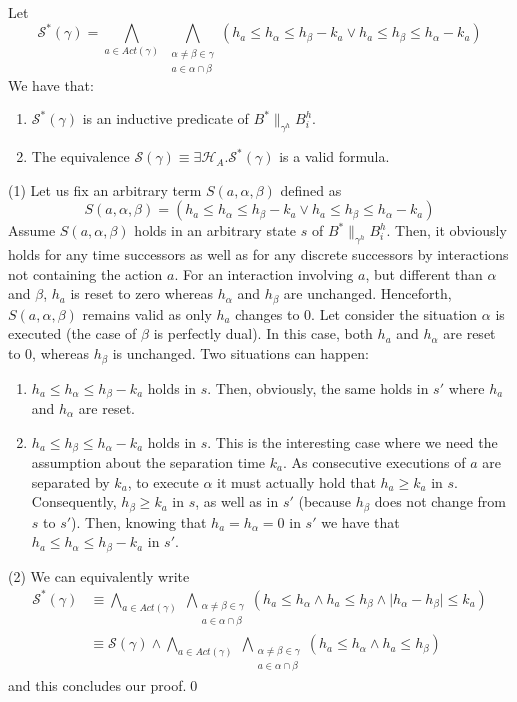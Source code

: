 \documentclass{LMCS}
\newcommand{\hp}{\mathcal{H}_A}
\newcommand{\sep}{\mathcal{S}}
\newcommand{\compgamma}{B^*}
\newcommand{\sysgammah}{\compgamma \|_{\gamma^h} B_i^h}
\theoremstyle{plain}\newtheorem{remark}[thm]{Remark}
\theoremstyle{plain}\newtheorem{example}[thm]{Example}
\begin{document}
\begin{prop} \label{p:cI} 
 Let $$\sep^*(\gamma) = \displaystyle{\bigwedge_{a \in
     Act(\gamma)}}\;\displaystyle{\bigwedge_{\substack{\alpha\neq\beta \in
       \gamma\\a \in \alpha \cap \beta}}} (h_a \le h_{\alpha} \le h_{\beta}
 - k_a \vee h_a \le h_{\beta} \le h_{\alpha} - k_a)$$
We have that:
\begin{enumerate}\item $\sep^*(\gamma)$ is an inductive predicate of $\sysgammah$.
\item The equivalence $\sep(\gamma) \equiv \exists \hp. \sep^*(\gamma)$ is a valid formula.
\end{enumerate}
\end{prop}
\proof (1) Let us fix an arbitrary term $S(a,\alpha,\beta)$ defined as 
$$S(a,\alpha,\beta) = (h_a \le h_{\alpha} \le h_{\beta}
- k_a \vee h_a \le h_{\beta} \le h_{\alpha} - k_a)$$ Assume
$S(a,\alpha,\beta)$ holds in an arbitrary state $s$ of $\sysgammah$.
Then, it obviously holds for any time successors as well as for any
discrete successors by interactions not containing the action $a$.
For an interaction involving $a$, but different than $\alpha$ and
$\beta$, $h_a$ is reset to zero whereas $h_\alpha$ and $h_\beta$ are
unchanged.  Henceforth, $S(a,\alpha,\beta)$ remains valid as only
$h_a$ changes to 0.  Let consider the situation $\alpha$ is executed
(the case of $\beta$ is perfectly dual).  In this case, both $h_a$ and
$h_\alpha$ are reset to 0, whereas $h_\beta$ is unchanged.  Two
situations can happen:
\begin{enumerate}[label=\({\alph*}]\item $h_a \le h_{\alpha} \le h_{\beta} - k_a$ holds in $s$.  Then,
  obviously, the same holds in $s'$ where $h_a$ and $h_\alpha$ are reset.
\item $h_a \le h_{\beta} \le h_{\alpha} - k_a$ holds in $s$.  This is the
  interesting case where we need the assumption about the separation time
  $k_a$.  As consecutive executions of $a$ are separated by $k_a$, to
  execute $\alpha$ it must actually hold that $h_a \ge k_a$ in $s$.
  Consequently, $h_\beta \ge k_a$ in $s$, as well as in $s'$ (because
  $h_\beta$ does not change from $s$ to $s'$).  Then, knowing that $h_a =
  h_\alpha = 0$ in $s'$ we have that $h_a \le h_\alpha \le h_\beta - k_a$
  in $s'$.
\end{enumerate}
(2) We can equivalently write 
\begin{align*}
\sep^*(\gamma) 
& \equiv \displaystyle{\bigwedge_{a \in
     Act(\gamma)}}\;\displaystyle{\bigwedge_{\substack{\alpha\neq\beta \in
       \gamma\\a \in \alpha \cap \beta}}} (h_a \le h_{\alpha} \wedge h_a \le h_\beta \wedge \mid h_\alpha - h_\beta \mid \le k_a) 
\end{align*}
\begin{align*}
& \equiv \sep(\gamma) \wedge \displaystyle{\bigwedge_{a \in
     Act(\gamma)}}\;\displaystyle{\bigwedge_{\substack{\alpha\neq\beta \in
       \gamma\\a \in \alpha \cap \beta}}} (h_a \le h_{\alpha} \wedge h_a \le h_{\beta}) 
\end{align*}
and this concludes our proof.\qed
\end{document}
